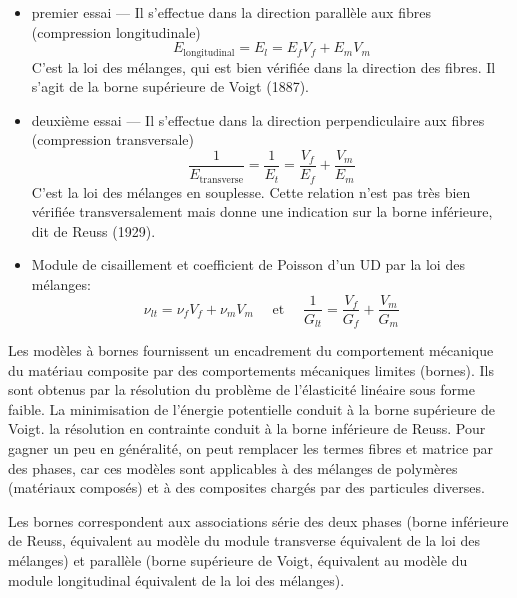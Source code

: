 \begin{itemize}
	\item premier essai --- Il s'effectue dans la direction parallèle aux fibres (compression longitudinale)
		\begin{equation} E_{\text{longitudinal}}=E_l=E_fV_f+E_mV_m \end{equation}
		C'est la loi des mélanges, qui est bien vérifiée dans la direction des fibres.
		Il s'agit de la borne supérieure de Voigt (1887).
	\item deuxième essai --- Il s'effectue dans la direction perpendiculaire aux fibres (compression transversale)
		\begin{equation}\dfrac1{E_{\text{transverse}}}=\dfrac1{E_t} = \dfrac{V_f}{E_f}+\dfrac{V_m}{E_m}\end{equation}
		C'est la loi des mélanges en souplesse.
		Cette relation n'est pas très bien vérifiée transversalement mais donne une
		indication sur la borne inférieure, dit de Reuss (1929).
	\item Module de cisaillement et coefficient de Poisson
		d'un UD par la loi des mélanges:
		\begin{equation}\nu_{lt}=\nu_fV_f+\nu_mV_m\quad\text{ et }\quad\dfrac1{G_{lt}} = \dfrac{V_f}{G_f}+\dfrac{V_m}{G_m}\end{equation}
\end{itemize}
\medskipvm
Les modèles à bornes fournissent un encadrement du comportement mécanique du matériau composite par des comportements mécaniques limites (bornes). Ils sont obtenus par la résolution du problème de l'élasticité linéaire sous forme faible. La minimisation de l'énergie potentielle conduit à la borne supérieure de Voigt. la résolution en contrainte conduit à la borne inférieure de Reuss.
\medskipvm
Pour gagner un peu en généralité, on peut remplacer les termes fibres et matrice par des phases, car ces modèles sont applicables à des mélanges de polymères (matériaux composés)
et à des composites chargés par des particules diverses. 

Les bornes correspondent aux associations série des deux phases (borne inférieure de Reuss, équivalent au modèle du module transverse équivalent de la loi des mélanges) et parallèle (borne supérieure de Voigt, équivalent au modèle du module longitudinal équivalent de la loi des mélanges).

